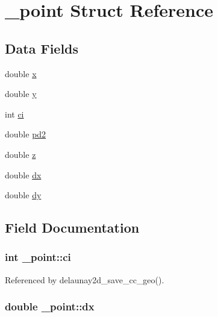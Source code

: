\hypertarget{struct__point}{}\section{\+\_\+point Struct Reference}
\label{struct__point}
\subsection*{Data Fields}
\begin{DoxyCompactItemize}
\item 
double \hyperlink{struct__point_a513f6fe169c2cfdfa8bb88de0b803a88}{x}
\item 
double \hyperlink{struct__point_ad466443e70f7ff7bcb1d2f8fda2c7168}{y}
\item 
int \hyperlink{struct__point_a294d6fbb1fe2bbae1951a3c4ecf0f93f}{ci}
\item 
double \hyperlink{struct__point_aa9e4cda89ec0b5901ea974f41b80e7a5}{pd2}
\item 
double \hyperlink{struct__point_aaf044203a60ed8b17f9a17cbdd08eb25}{z}
\item 
double \hyperlink{struct__point_a804faff86adcfd2e2115c0ec97f659e6}{dx}
\item 
double \hyperlink{struct__point_a16e8d47539ec8397986182aff29d782c}{dy}
\end{DoxyCompactItemize}


\subsection{Field Documentation}
\subsubsection[{\texorpdfstring{ci}{ci}}]{\setlength{\rightskip}{0pt plus 5cm}int \+\_\+point\+::ci}\hypertarget{struct__point_a294d6fbb1fe2bbae1951a3c4ecf0f93f}{}\label{struct__point_a294d6fbb1fe2bbae1951a3c4ecf0f93f}


Referenced by delaunay2d\+\_\+save\+\_\+cc\+\_\+geo().

\subsubsection[{\texorpdfstring{dx}{dx}}]{\setlength{\rightskip}{0pt plus 5cm}double \+\_\+point\+::dx}\hypertarget{struct__point_a804faff86adcfd2e2115c0ec97f659e6}{}\label{struct__point_a804faff86adcfd2e2115c0ec97f659e6}


